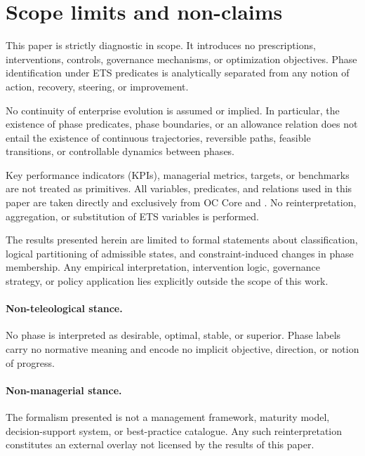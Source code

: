 ﻿\section{Scope limits and non-claims}
\label{sec:limits}

This paper is strictly diagnostic in scope.
It introduces no prescriptions, interventions, controls, governance mechanisms,
or optimization objectives.
Phase identification under ETS predicates is analytically separated from any
notion of action, recovery, steering, or improvement.

No continuity of enterprise evolution is assumed or implied.
In particular, the existence of phase predicates, phase boundaries, or an
allowance relation does not entail the existence of continuous trajectories,
reversible paths, feasible transitions, or controllable dynamics between phases.

Key performance indicators (KPIs), managerial metrics, targets, or benchmarks
are not treated as primitives.
All variables, predicates, and relations used in this paper are taken directly
and exclusively from OC Core and .
No reinterpretation, aggregation, or substitution of ETS variables is performed.

The results presented herein are limited to formal statements about
classification, logical partitioning of admissible states, and
constraint-induced changes in phase membership.
Any empirical interpretation, intervention logic, governance strategy, or
policy application lies explicitly outside the scope of this work.

\paragraph{Non-teleological stance.}
No phase is interpreted as desirable, optimal, stable, or superior.
Phase labels carry no normative meaning and encode no implicit objective,
direction, or notion of progress.

\paragraph{Non-managerial stance.}
The formalism presented is not a management framework, maturity model,
decision-support system, or best-practice catalogue.
Any such reinterpretation constitutes an external overlay not licensed by
the results of this paper.
